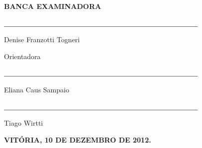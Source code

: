 \documentclass[a4paper]{article}
\begin{document}
\bigskip

{\sffamily\bfseries
BANCA EXAMINADORA}


\bigskip


\bigskip

{\sffamily\bfseries
\_\_\_\_\_\_\_\_\_\_\_\_\_\_\_\_\_\_\_\_\_\_\_\_\_\_\_\_\_\_\_\_}

{\sffamily
Denise Franzotti Togneri}

{\sffamily
Orientadora}


\bigskip


\bigskip

{\sffamily\bfseries
\_\_\_\_\_\_\_\_\_\_\_\_\_\_\_\_\_\_\_\_\_\_\_\_\_\_\_\_\_\_\_\_}

{\sffamily
Eliana Caus Sampaio}


\bigskip


\bigskip

{\sffamily\bfseries
\_\_\_\_\_\_\_\_\_\_\_\_\_\_\_\_\_\_\_\_\_\_\_\_\_\_\_\_\_\_\_\_}

{\sffamily
Tiago Wirtti}


\bigskip


\bigskip


\bigskip


\bigskip


\bigskip


\bigskip

{
\foreignlanguage{portuges}{\textsf{\textbf{VIT\'ORIA, 10 DE DEZEMBRO DE 2012.}}}}


\bigskip


\bigskip


\bigskip


\bigskip


\bigskip


\bigskip


\bigskip


\bigskip


\bigskip


\bigskip


\bigskip


\bigskip


\bigskip


\bigskip


\bigskip


\bigskip


\bigskip
\end{document}
